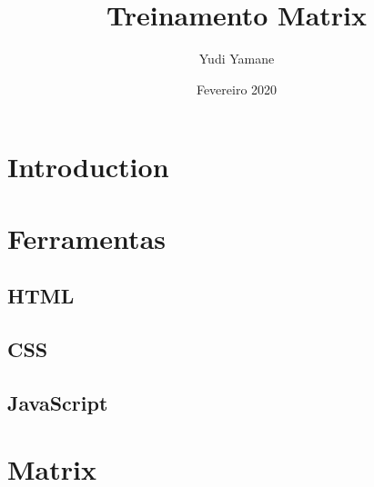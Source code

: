 \documentclass{article}
\title{Treinamento Matrix}
\author{Yudi Yamane}
\date{Fevereiro 2020}
\begin{document}
\maketitle

\section{Introduction}


\section{Ferramentas}

\subsection{HTML}


\subsection{CSS}


\subsection{JavaScript}


\section{Matrix}




\end{document}
